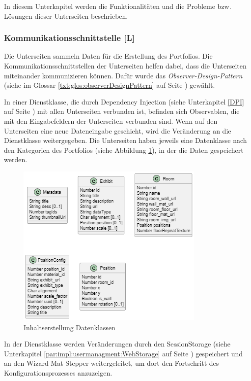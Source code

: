 In diesem Unterkapitel werden die Funktionalitäten und die Probleme bzw. Lösungen dieser Unterseiten beschrieben. 

\subsubsection{Kommunikationsschnittstelle [L]}
Die Unterseiten sammeln Daten für die Erstellung des Portfolios. Die Kommunikationsschnittstellen der Unterseiten helfen dabei, dass die Unterseiten miteinander kommunizieren können. Dafür wurde das \emph{Observer-Design-Pattern} (siehe im Glossar \ref{txt:glos:observerDesignPattern} auf Seite \pageref{txt:glos:observerDesignPattern}) gewählt.

In einer Dienstklasse, die durch Dependency Injection (siehe Unterkapitel \ref{DPI} auf Seite \pageref{DPI}) mit allen Unterseiten verbunden ist, befinden sich Observablen, die mit den Eingabefeldern der Unterseiten verbunden sind. Wenn auf den Unterseiten eine neue Dateneingabe geschieht, wird die Veränderung an die Dienstklasse weitergegeben. Die Unterseiten haben jeweils eine Datenklasse nach den Kategorien des Portfolios (siehe Abbildung \ref{fig:impl:creation:dataclasses}), in der die Daten gespeichert werden.

\begin{figure}
    \centering
    \includegraphics[scale=0.7]{pics/content_creation_classes.png}
    \caption{Inhaltserstellung Datenklassen}
    \label{fig:impl:creation:dataclasses}
\end{figure}

In der Dienstklasse werden Veränderungen durch den SessionStorage (siehe Unterkapitel \ref{par:impl:usermanagment:WebStorage} auf Seite \pageref{par:impl:usermanagment:WebStorage}) gespeichert und an den Wizard Mat-Stepper weitergeleitet, um dort den Fortschritt des Konfigurationsprozesses anzuzeigen.

